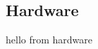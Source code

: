 \documentclass[.../Dokumentation.tex]{subfiles}
\begin{document}
    \subsection{Hardware}\label{sec-components-hardware}
    hello from hardware
\end{document}
